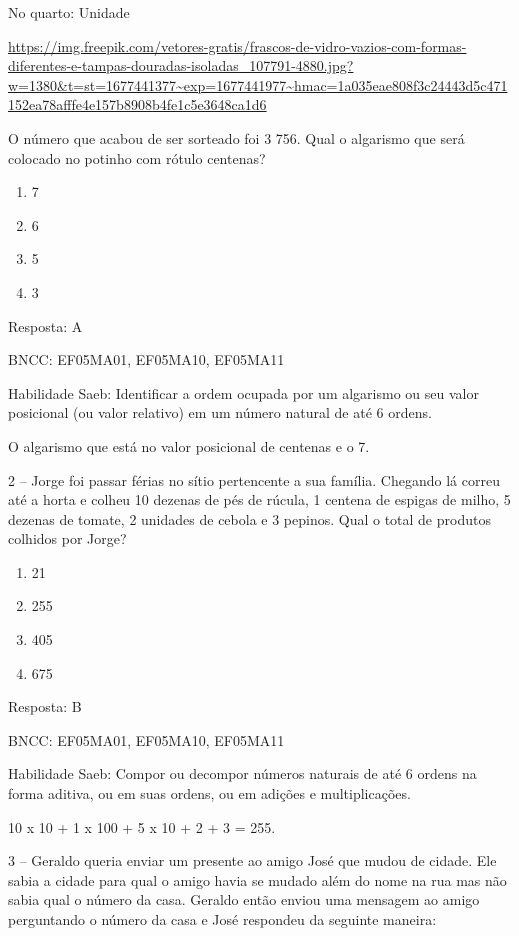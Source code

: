 No quarto: Unidade

\url{https://img.freepik.com/vetores-gratis/frascos-de-vidro-vazios-com-formas-diferentes-e-tampas-douradas-isoladas_107791-4880.jpg?w=1380\&t=st=1677441377~exp=1677441977~hmac=1a035eae808f3c24443d5c471152ea78afffe4e157b8908b4fe1c5e3648ca1d6}

O número que acabou de ser sorteado foi 3 756. Qual o algarismo que será
colocado no potinho com rótulo centenas?

\begin{enumerate}
\def\labelenumi{\alph{enumi})}
\item
  7
\item
  6
\item
  5
\item
  3
\end{enumerate}

Resposta: A

BNCC: EF05MA01, EF05MA10, EF05MA11

Habilidade Saeb: Identificar a ordem ocupada por um algarismo ou seu
valor posicional (ou valor relativo) em um número natural de até 6
ordens.

O algarismo que está no valor posicional de centenas e o 7.

2 -- Jorge foi passar férias no sítio pertencente a sua família.
Chegando lá correu até a horta e colheu 10 dezenas de pés de rúcula, 1
centena de espigas de milho, 5 dezenas de tomate, 2 unidades de cebola e
3 pepinos. Qual o total de produtos colhidos por Jorge?

\begin{enumerate}
\def\labelenumi{\alph{enumi})}
\item
  21
\item
  255
\item
  405
\item
  675
\end{enumerate}

Resposta: B

BNCC: EF05MA01, EF05MA10, EF05MA11

Habilidade Saeb: Compor ou decompor números naturais de até 6 ordens na
forma aditiva, ou em suas ordens, ou em adições e multiplicações.

10 x 10 + 1 x 100 + 5 x 10 + 2 + 3 = 255.

3 -- Geraldo queria enviar um presente ao amigo José que mudou de
cidade. Ele sabia a cidade para qual o amigo havia se mudado além do
nome na rua mas não sabia qual o número da casa. Geraldo então enviou
uma mensagem ao amigo perguntando o número da casa e José respondeu da
seguinte maneira:

